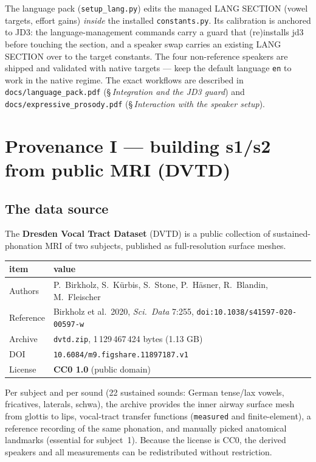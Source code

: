 \documentclass[11pt,a4paper]{article}
\newcommand{\code}[1]{\texttt{#1}}
\begin{document}
The language pack (\code{setup\_lang.py}) edits the managed LANG
SECTION (vowel targets, effort gains) \emph{inside} the installed
\code{constants.py}. Its calibration is anchored to JD3: the
language-management commands carry a guard that (re)installs jd3
before touching the section, and a speaker swap carries an existing
LANG SECTION over to the target constants. The four non-reference
speakers are shipped and validated with native targets --- keep the
default language \code{en} to work in the native regime. The exact
workflows are described in \code{docs/language\_pack.pdf}
(\S\,\emph{Integration and the JD3 guard}) and
\code{docs/expressive\_prosody.pdf} (\S\,\emph{Interaction with the
speaker setup}).

\section{Provenance I --- building s1/s2 from public MRI (DVTD)}\label{sec:dvtd}

\subsection{The data source}

The \textbf{Dresden Vocal Tract Dataset} (DVTD) is a public
collection of sustained-phonation MRI of two subjects, published as
full-resolution surface meshes.

\begin{center}
\small
\begin{tabular}{@{}ll@{}}
\toprule
\textbf{item} & \textbf{value} \\
\midrule
Authors & P.~Birkholz, S.~K\"urbis, S.~Stone, P.~H\"asner,
R.~Blandin, M.~Fleischer \\
Reference & Birkholz et al.\ 2020, \emph{Sci.\ Data} 7:255,
\code{doi:10.1038/s41597-020-00597-w} \\
Archive & \code{dvtd.zip}, 1\,129\,467\,424 bytes (1.13 GB) \\
DOI & \code{10.6084/m9.figshare.11897187.v1} \\
License & \textbf{CC0 1.0} (public domain) \\
\bottomrule
\end{tabular}
\end{center}

Per subject and per sound (22 sustained sounds: German tense/lax
vowels, fricatives, laterals, schwa), the archive provides the inner
airway surface mesh from glottis to lips, vocal-tract transfer
functions (\code{measured} and finite-element), a reference recording
of the same phonation, and manually picked anatomical landmarks
(essential for subject~1). Because the license is CC0, the derived
speakers and all measurements can be redistributed without
restriction.
\end{document}
